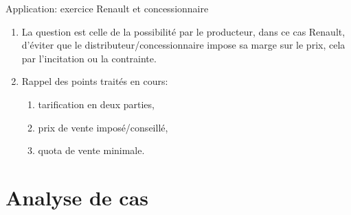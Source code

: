 \begin{frame}[allowframebreaks]{Application: exercice Renault et concessionnaire}
\begin{enumerate}
\begin{enumerate}[$\star$]
    \item La question est celle de la possibilité par le producteur, dans ce cas Renault, 
    d'éviter que le distributeur/concessionnaire impose sa marge sur le prix, 
    cela par l'incitation ou la contrainte.
    \item Rappel des points traités en cours:
    \begin{enumerate}[$\star$]
        \item tarification en deux parties,
        \item prix de vente imposé/conseillé,
        \item quota de vente minimale.
    \end{enumerate}
\end{enumerate}
\end{enumerate}
\end{frame}

\section{Analyse de cas}
\frame{\sectionpage}

